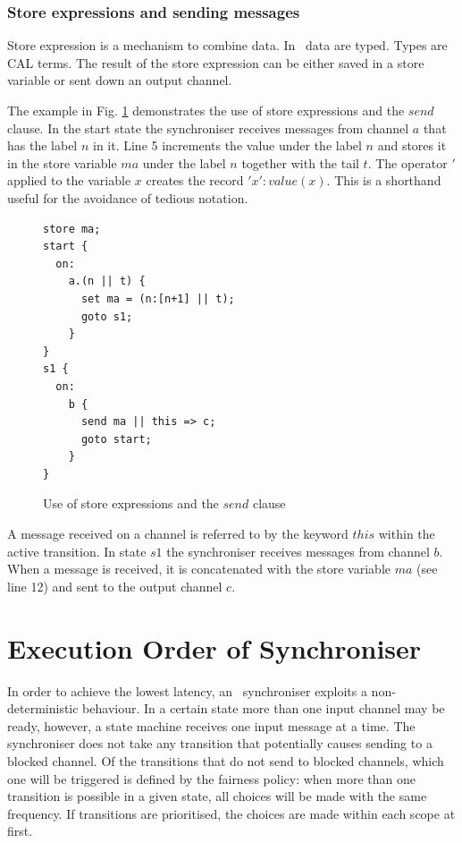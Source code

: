   \subsubsection{Store expressions and sending messages}
Store expression is a mechanism to combine data. In \ak\, data are typed. Types are CAL terms. The result of the store expression can be either saved in a store variable or sent down an output channel.

The example in Fig. \ref{sync_send} demonstrates the use of store expressions and the $send$ clause. In the start state the synchroniser receives messages from channel $a$ that has the label $n$ in it. Line 5 increments the value under the label $n$ and stores it in the store variable $ma$ under the label $n$ together with the tail $t$. The operator $'$ applied to the variable $x$ creates the record $'x': value(x)$. This is a shorthand useful for the avoidance of tedious notation.

\begin{figure}[h!]
\lstset{numbers=left, numberstyle=\small, stepnumber=1, numbersep=8pt}
\begin{lstlisting}[frame=single]
store ma;
start {
  on:
    a.(n || t) {
      set ma = (n:[n+1] || t);
      goto s1;
    }
}
s1 {
  on:
    b {
      send ma || this => c;
      goto start;
    }
}
\end{lstlisting}
\caption{Use of store expressions and the $send$ clause}
\label{sync_send}
\end{figure}

A message received on a channel is referred to by the keyword $this$ within the active transition. In state $s1$ the synchroniser receives messages from channel $b$. When a message is received, it is concatenated with the store variable $ma$ (see line 12) and sent to the output channel $c$.


\section{Execution Order of Synchroniser\label{execod}}
In order to achieve the lowest latency, an \ak\ synchroniser exploits a non-deterministic behaviour. In a certain state more than one input channel may be ready, however, a state machine receives one input message at a time. The synchroniser does not take any transition that potentially causes sending to a blocked channel. Of the transitions that do not send to blocked channels, which one will be triggered is defined by the fairness policy: when more than one transition is possible in a given state, all choices will be made with the same frequency. If transitions are prioritised, the choices are made within each scope at first.

